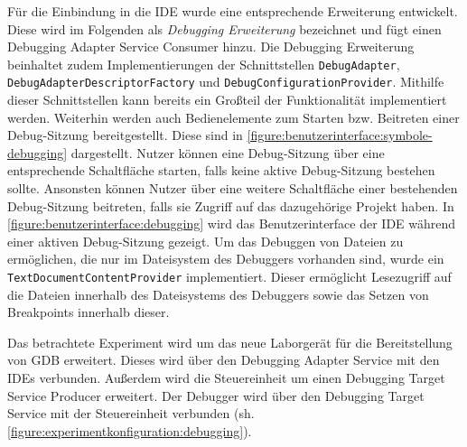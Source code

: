 Für die Einbindung in die IDE wurde eine entsprechende Erweiterung entwickelt. Diese wird im Folgenden als \textit{Debugging Erweiterung} bezeichnet und fügt einen Debugging Adapter Service Consumer hinzu. Die Debugging Erweiterung beinhaltet zudem Implementierungen der Schnittstellen \texttt{DebugAdapter}, \texttt{DebugAdapterDescriptorFactory} und \texttt{DebugConfigurationProvider}. Mithilfe dieser Schnittstellen kann bereits ein Großteil der Funktionalität implementiert werden. Weiterhin werden auch Bedienelemente zum Starten bzw. Beitreten einer Debug-Sitzung bereitgestellt. Diese sind in \autoref{figure:benutzerinterface:symbole-debugging} dargestellt. Nutzer können eine Debug-Sitzung über eine entsprechende Schaltfläche starten, falls keine aktive Debug-Sitzung bestehen sollte. Ansonsten können Nutzer über eine weitere Schaltfläche einer bestehenden Debug-Sitzung beitreten, falls sie Zugriff auf das dazugehörige Projekt haben. In \autoref{figure:benutzerinterface:debugging} wird das Benutzerinterface der IDE während einer aktiven Debug-Sitzung gezeigt. Um das Debuggen von Dateien zu ermöglichen, die nur im Dateisystem des Debuggers vorhanden sind, wurde ein \texttt{TextDocumentContentProvider} implementiert. Dieser ermöglicht Lesezugriff auf die Dateien innerhalb des Dateisystems des Debuggers sowie das Setzen von Breakpoints innerhalb dieser.

Das betrachtete Experiment wird um das neue Laborgerät für die Bereitstellung von GDB erweitert. Dieses wird über den Debugging Adapter Service mit den IDEs verbunden. Außerdem wird die Steuereinheit um einen Debugging Target Service Producer erweitert. Der Debugger wird über den Debugging Target Service mit der Steuereinheit verbunden (sh. \autoref{figure:experimentkonfiguration:debugging}).